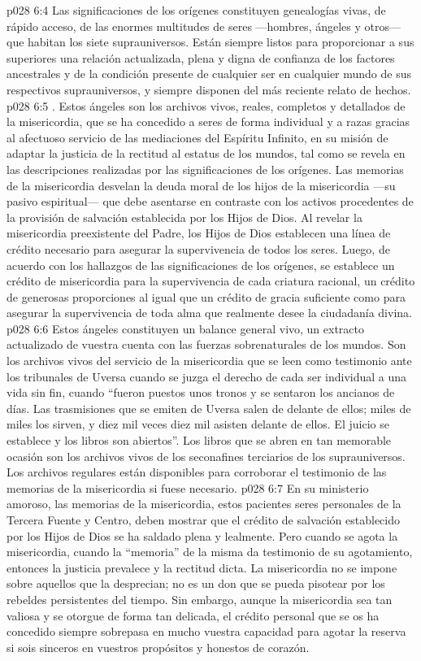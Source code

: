 \vs p028 6:4 Las significaciones de los orígenes constituyen genealogías vivas, de rápido acceso, de las enormes multitudes de seres ---hombres, ángeles y otros--- que habitan los siete suprauniversos. Están siempre listos para proporcionar a sus superiores una relación actualizada, plena y digna de confianza de los factores ancestrales y de la condición presente de cualquier ser en cualquier mundo de sus respectivos suprauniversos, y siempre disponen del más reciente relato de hechos.
\vs p028 6:5 . Estos ángeles son los archivos vivos, reales, completos y detallados de la misericordia, que se ha concedido a seres de forma individual y a razas gracias al afectuoso servicio de las mediaciones del Espíritu Infinito, en su misión de adaptar la justicia de la rectitud al estatus de los mundos, tal como se revela en las descripciones realizadas por las significaciones de los orígenes. Las memorias de la misericordia desvelan la deuda moral de los hijos de la misericordia ---su pasivo espiritual--- que debe asentarse en contraste con los activos procedentes de la provisión de salvación establecida por los Hijos de Dios. Al revelar la misericordia preexistente del Padre, los Hijos de Dios establecen una línea de crédito necesario para asegurar la supervivencia de todos los seres. Luego, de acuerdo con los hallazgos de las significaciones de los orígenes, se establece un crédito de misericordia para la supervivencia de cada criatura racional, un crédito de generosas proporciones al igual que un crédito de gracia suficiente como para asegurar la supervivencia de toda alma que realmente desee la ciudadanía divina.
\vs p028 6:6 Estos ángeles constituyen un balance general vivo, un extracto actualizado de vuestra cuenta con las fuerzas sobrenaturales de los mundos. Son los archivos vivos del servicio de la misericordia que se leen como testimonio ante los tribunales de Uversa cuando se juzga el derecho de cada ser individual a una vida sin fin, cuando “fueron puestos unos tronos y se sentaron los ancianos de días. Las trasmisiones que se emiten de Uversa salen de delante de ellos; miles de miles los sirven, y diez mil veces diez mil asisten delante de ellos. El juicio se establece y los libros son abiertos”. Los libros que se abren en tan memorable ocasión son los archivos vivos de los seconafines terciarios de los suprauniversos. Los archivos regulares están disponibles para corroborar el testimonio de las memorias de la misericordia si fuese necesario.
\vs p028 6:7 En su ministerio amoroso, las memorias de la misericordia, estos pacientes seres personales de la Tercera Fuente y Centro, deben mostrar que el crédito de salvación establecido por los Hijos de Dios se ha saldado plena y lealmente. Pero cuando se agota la misericordia, cuando la “memoria” de la misma da testimonio de su agotamiento, entonces la justicia prevalece y la rectitud dicta. La misericordia no se impone sobre aquellos que la desprecian; no es un don que se pueda pisotear por los rebeldes persistentes del tiempo. Sin embargo, aunque la misericordia sea tan valiosa y se otorgue de forma tan delicada, el crédito personal que se os ha concedido siempre sobrepasa en mucho vuestra capacidad para agotar la reserva si sois sinceros en vuestros propósitos y honestos de corazón.
